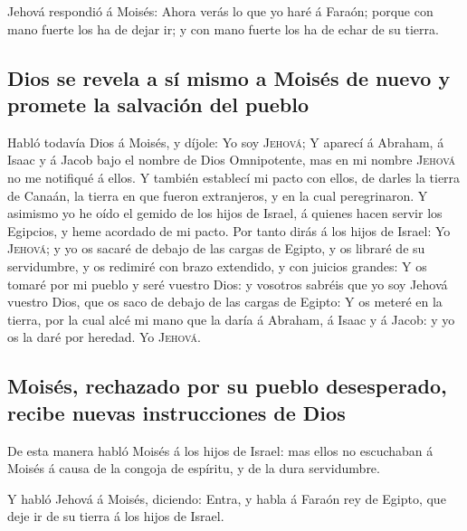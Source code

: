  Jehová respondió á Moisés: Ahora verás lo que yo haré á
Faraón; porque con mano fuerte los ha de dejar ir; y con mano fuerte los
ha de echar de su tierra.

\hypertarget{dios-se-revela-a-suxed-mismo-a-moisuxe9s-de-nuevo-y-promete-la-salvaciuxf3n-del-pueblo}{%
\subsection{Dios se revela a sí mismo a Moisés de nuevo y promete la
salvación del
pueblo}\label{dios-se-revela-a-suxed-mismo-a-moisuxe9s-de-nuevo-y-promete-la-salvaciuxf3n-del-pueblo}}

 Habló todavía Dios á Moisés, y díjole: Yo soy
\textsc{Jehová};  Y aparecí á Abraham, á Isaac y á Jacob
bajo el nombre de Dios Omnipotente, mas en mi nombre \textsc{Jehová} no
me notifiqué á ellos.  Y también establecí mi pacto con
ellos, de darles la tierra de Canaán, la tierra en que fueron
extranjeros, y en la cual peregrinaron.  Y asimismo yo he
oído el gemido de los hijos de Israel, á quienes hacen servir los
Egipcios, y heme acordado de mi pacto.  Por tanto dirás á
los hijos de Israel: Yo \textsc{Jehová}; y yo os sacaré de debajo de las
cargas de Egipto, y os libraré de su servidumbre, y os redimiré con
brazo extendido, y con juicios grandes:  Y os tomaré por
mi pueblo y seré vuestro Dios: y vosotros sabréis que yo soy Jehová
vuestro Dios, que os saco de debajo de las cargas de Egipto:
 Y os meteré en la tierra, por la cual alcé mi mano que la
daría á Abraham, á Isaac y á Jacob: y yo os la daré por heredad. Yo
\textsc{Jehová}.

\hypertarget{moisuxe9s-rechazado-por-su-pueblo-desesperado-recibe-nuevas-instrucciones-de-dios}{%
\subsection{Moisés, rechazado por su pueblo desesperado, recibe nuevas
instrucciones de
Dios}\label{moisuxe9s-rechazado-por-su-pueblo-desesperado-recibe-nuevas-instrucciones-de-dios}}

 De esta manera habló Moisés á los hijos de Israel: mas
ellos no escuchaban á Moisés á causa de la congoja de espíritu, y de la
dura servidumbre.

 Y habló Jehová á Moisés, diciendo: 
Entra, y habla á Faraón rey de Egipto, que deje ir de su tierra á los
hijos de Israel.

